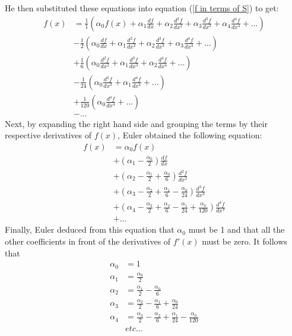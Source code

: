 He then substituted these equations into equation (\ref{f in terms of S}) to get:
\begin{align*}
    f(x) &= \frac{1}{1}\left(\alpha_0 f(x) + \alpha_1 \frac{df}{dx} + \alpha_2 \frac{d^2f}{dx^2} + \alpha_3 \frac{d^3f}{dx^3} + \alpha_4 \frac{d^4f}{dx^4} + \dots\right) \\
    &-\frac{1}{2}\left(\alpha_0 \frac{df}{dx} + \alpha_1 \frac{d^2f}{dx^2} + \alpha_2 \frac{d^3f}{dx^3} + \alpha_3 \frac{d^4f}{dx^4} + \dots\right) \\
    &+ \frac{1}{6}\left(\alpha_0 \frac{d^2f}{dx^2} + \alpha_1 \frac{d^3f}{dx^3} + \alpha_2 \frac{d^4f}{dx^4} + \dots\right) \\
    &- \frac{1}{24}\left(\alpha_0 \frac{d^3f}{dx^3} + \alpha_1 \frac{d^4f}{dx^4} + \dots\right) \\
    &+ \frac{1}{120}\left(\alpha_0 \frac{d^4f}{dx^4} + \dots\right) \\
    &- \dots
\end{align*}
Next, by expanding the right hand side and grouping the terms by their respective derivatives of $f(x)$, Euler obtained the following equation:
\begin{align*}
    f(x) &= \alpha_0 f(x) \\
    &+ \left(\alpha_1 - \frac{\alpha_0}{2}\right)\frac{df}{dx} \\
    &+ \left(\alpha_2 - \frac{\alpha_1}{2} + \frac{\alpha_0}{6} \right)\frac{d^2f}{dx^2}  \\
    &+ \left(\alpha_3 - \frac{\alpha_2}{2} + \frac{\alpha_1}{6} - \frac{\alpha_0}{24}\right)\frac{d^3f}{dx^3} \\
    &+ \left(\alpha_4 - \frac{\alpha_3}{2} + \frac{\alpha_2}{6} - \frac{\alpha_1}{24} + \frac{\alpha_0}{120}\right)\frac{d^4f}{dx^4} \\
    &+ \dots 
\end{align*}
Finally, Euler deduced from this equation that $\alpha_0$ must be 1 and that all the other coefficients in front of the derivatives of $f'(x)$ must be zero. It follows that
\begin{align*}
    \alpha_0 &= 1 \\
    \alpha_1 &= \frac{\alpha_0}{2} \\
    \alpha_2 &= \frac{\alpha_1}{2} - \frac{\alpha_0}{6} \\
    \alpha_3 &= \frac{\alpha_2}{2} - \frac{\alpha_1}{6} + \frac{\alpha_0}{24} \\
    \alpha_4 &= \frac{\alpha_3}{2} - \frac{\alpha_2}{6} + \frac{\alpha_1}{24} - \frac{\alpha_0}{120} \\
    & etc \dots
\end{align*}
